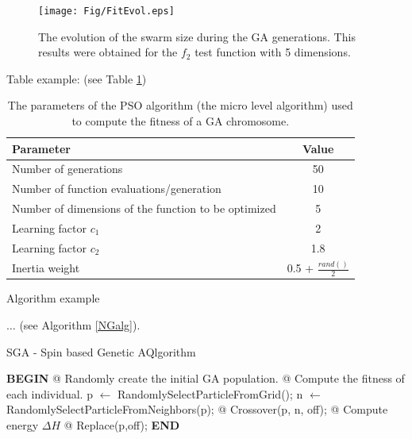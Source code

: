 \documentclass[runningheads,a4paper,11pt]{report}
\begin{document}
\begin{figure}[htbp]
	\centerline{\texttt{[image: Fig/FitEvol.eps]}}  
	\caption{The evolution of the swarm size during the GA generations. This results were obtained for the $f_2$ test function with 5 dimensions.}
	\label{swarmsize}
\end{figure}


Table example: (see Table \ref{tab3PSO})


\begin{table}[htbp]
	\caption{The parameters of the PSO algorithm (the micro level algorithm) used to compute the fitness of a GA chromosome.}
	\label{tab3PSO}
		\begin{center}
			\begin{tabular}{p{220pt}c}

				\textbf{Parameter}& \textbf{Value} \\
				\hline\hline
 				Number of generations& 50 \\
 				Number of function evaluations/generation& 10 \\
 				Number of dimensions of the function to be optimized& 5 \\
 				Learning factor $c_{1}$& 2 \\
 				Learning factor $c_{2}$ & 1.8\\
 				Inertia weight& 0.5 + $\frac{rand()}{2}$\\
		
			\end{tabular}
		\end{center}
\end{table}

Algorithm example 

$\ldots$ (see Algorithm \ref{NGalg}).



\begin{algorithm}
	\caption{SGA - Spin based Genetic AQlgorithm}
	\label{NGalg}
		\begin{algorithmic}


			\STATE \textbf{BEGIN}
  		\STATE @ Randomly create the initial GA population.
  		\STATE @ Compute the fitness of each individual.
  				\STATE p $\leftarrow$ RandomlySelectParticleFromGrid();
  				\STATE n $\leftarrow$ RandomlySelectParticleFromNeighbors(p);
  				\STATE @ Crossover(p, n, off);
  				\STATE @ Compute energy $\Delta H$
  					\STATE @ Replace(p,off);
  				\ENDIF
  			\ENDFOR
  		\ENDFOR
  		\STATE \textbf{END}
\end{algorithmic}
\end{algorithm}




\end{document}
